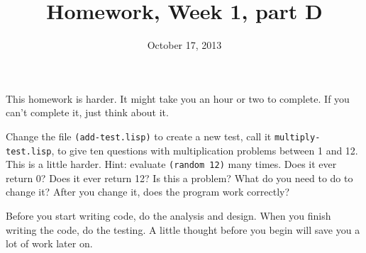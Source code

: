 \documentclass{article}
\title{Homework, Week 1, part D}
\date{October 17, 2013}
\begin{document}
\maketitle{}

This homework is harder. It might take you an hour or two to complete. If you can't complete it, just think about it.

Change the file \texttt{(add-test.lisp)} to create a new test, call it \texttt{multiply-test.lisp}, to give ten questions with multiplication problems between 1 and 12. This is a little harder. Hint: evaluate \texttt{(random 12)} many times. Does it ever return 0? Does it ever return 12? Is this a problem? What do you need to do to change it? After you change it, does the program work correctly?

Before you start writing code, do the analysis and design. When you finish writing the code, do the testing. A little thought before you begin will save you a lot of work later on.
\end{document}
